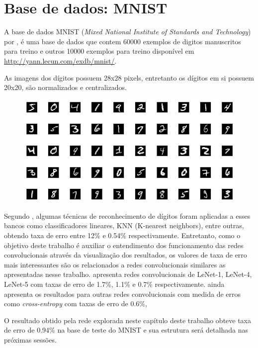 \documentclass[
	12pt,				%
	oneside,			%
	a4paper,			%
	english,			%
	french,				%
	spanish,			%
	brazil,				%
	]{abntex2}
\begin{document}
\section{Base de dados: MNIST}

\par A base de dados MNIST (\textit{Mixed National Institute of Standards and Technology}) por , é uma base de dados que contem 60000 exemplos de digitos manuscritos para treino e outros 10000 exemplos para treino disponível em \url{http://yann.lecun.com/exdb/mnist/}.

\par As imagens dos dígitos possuem 28x28 pixels, entretanto os dígitos em si possuem 20x20, são normalizados e centralizados.

\begin{figure}
	\centering
	\includegraphics[width=0.7\linewidth]{images/fabio/inputs}
	\caption[Exemplos dos 50 primeiros digítos disponíveis na base de dados do MNIST.]{}
	\caption{}
	\label{fig:inputs}
\end{figure}

\par Segundo , algumas técnicas de reconhecimento de dígitos foram aplicadas a esses bancos como classificadores lineares, KNN (K-nearest neighbors), entre outras, obtendo taxa de erro entre 12\% e 0.54\% respectivamente. Entretanto, como o objetivo deste trabalho é auxiliar o entendimento dos funcionamento das redes convolucionais através da visualização dos resultados, os valores de taxa de erro mais interessantes são os relacionados a redes convolucionais similares as apresentadas nesse trabalho.  apresenta redes convolucionais de LeNet-1, LeNet-4, LeNet-5 com taxas de erro de 1.7\%, 1.1\% e 0.7\% respectivamente.  ainda apresenta os resultados para outras redes convolucionais com medida de erros como \textit{cross-entropy} com taxas de erro de 0.6\%,

\par O resultado obtido pela rede explorada neste capítulo deste trabalho obteve taxa de erro de 0.94\% na base de teste do MNIST e sua estrutura será detalhada nas próximas sessões.
\end{document}
